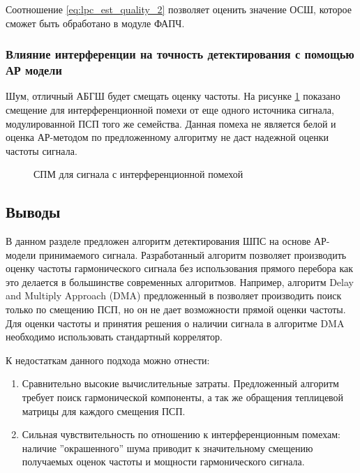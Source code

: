 Соотношение \ref{eq:lpc_est_quality_2} позволяет оценить значение ОСШ, которое сможет
быть обработано в модуле ФАПЧ.


\subsubsection{Влияние интерференции на точность детектирования с помощью АР модели}
Шум, отличный АБГШ будет смещать оценку частоты. На рисунке \ref{pic:lpc_2sat_psd} показано
смещение для интерференционной помехи от еще одного источника сигнала, модулированной ПСП того же семейства.
Данная помеха не является белой и оценка АР-методом по предложенному алгоритму не даст надежной оценки частоты сигнала.

\begin{figure}[H]
	\center{}
	\caption{СПМ для сигнала с интерференционной помехой}
	\label{pic:lpc_2sat_psd}
\end{figure}

\subsection*{Выводы}
\label{ssec:sec3_lpc_conclusion}

В данном разделе предложен алгоритм детектирования ШПС на основе АР-модели принимаемого сигнала.
Разработанный алгоритм позволяет производить оценку частоты гармонического сигнала без использования прямого
перебора как это делается в большинстве современных алгоритмов. Например, алгоритм Delay and Multiply Approach (DMA) предложенный в 
\cite{lin_dma, tsui} позволяет производить поиск только по смещению ПСП, но он не дает возможности прямой оценки частоты.
Для оценки частоты и принятия решения о наличии сигнала в алгоритме DMA необходимо использовать стандартный коррелятор.

К недостаткам данного подхода можно отнести: 
\begin{enumerate}
	\item Сравнительно высокие вычислительные затраты. Предложенный алгоритм требует поиск гармонической
		компоненты, а так же обращения теплицевой матрицы для каждого смещения ПСП.
	\item Сильная чувствительность по отношению к интерференционным помехам: наличие
		''окрашенного'' шума приводит к значительному смещению получаемых
		оценок частоты и мощности гармонического сигнала.
\end{enumerate}


